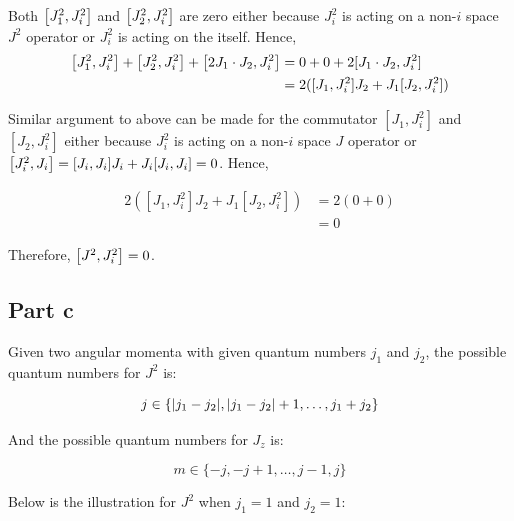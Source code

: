 \documentclass{article}
\begin{document}
Both $\commutator{J_1^2}{J_i^2}$ and $\commutator{J_2^2}{J_i^2}$ are zero 
either because $J_i^2$ is acting on a non-$i$ space $J^2$ operator or 
$J_i^2$ is acting on the itself. Hence,
\begin{align*}
  \commutator{J_1^2}{J_i^2} + \commutator{J_2^2}{J_i^2} + \commutator{2J_1 \cdot J_2}{J_i^2} &= 0 + 0 + 2[J_1 \cdot J_2, J_i^2] \\
  &= 2([J_1, J_i^2]J_2 + J_1[J_2, J_i^2]) \\
\end{align*}

Similar argument to above can be made for the commutator $[J_1, J_i^2]$ and $[J_2, J_i^2]$ either
because $J_i^2$ is acting on a non-$i$ space $J$ operator or $\commutator{J_i^2}{J_i} = \commutator{J_i}{J_i}J_i 
+ J_i\commutator{J_i}{J_i} = 0$. Hence,

\begin{align*}
  2([J_1, J_i^2]J_2 + J_1[J_2, J_i^2]) &= 2(0 + 0) \\
  &= 0
\end{align*}

Therefore, $\commutator{J^2}{J_i^2} = 0$.

\subsection{Part c}

Given two angular momenta with given quantum numbers $j_1$ and $j_2$, the possible quantum numbers
for $J^2$ is:

\begin{equation}
j \in \{\abs{j_1 - j_2}, \abs{j_1 - j_2} + 1, \ldots,  j_1 + j_2\}
\end{equation}

And the possible quantum numbers for $J_z$ is:

\begin{equation}
  m \in \{-j, -j+1, \ldots, j-1, j\}
\end{equation}

Below is the illustration for $J^2$ when $j_1 = 1$ and $j_2 = 1$:
\end{document}
